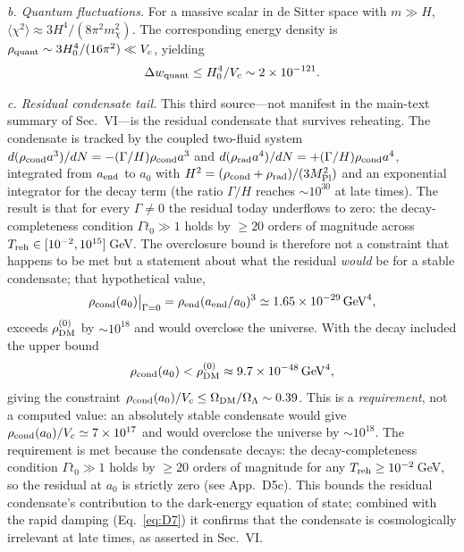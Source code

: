 \documentclass[pdflatex,sn-mathphys-num]{sn-jnl}
\providecommand{\gtrsim}{\geq}
\newcommand{\MP}{M_{\rm Pl}}
\theoremstyle{thmstyleone}
\begin{document}
\begin{appendices}
\emph{b. Quantum fluctuations.} For a massive scalar in de Sitter space with $m\gg H$, $\langle\chi^2\rangle\approx3H^4/(8\pi^2 m_\chi^2)$. The corresponding energy density is $\rho_{\rm quant}\sim3H_0^4/(16\pi^2)\ll V_c$, yielding
\begin{equation}
\Delta w_{\rm quant}\leq H_0^4/V_c\sim2\times10^{-121}.
\label{eq:D11}
\end{equation}

\emph{c. Residual condensate tail.} This third source---not manifest in the main-text summary of Sec.~VI---is the residual condensate that survives reheating. The condensate is tracked by the coupled two-fluid system $d(\rho_{\rm cond}a^3)/dN=-(\Gamma/H)\rho_{\rm cond}a^3$ and $d(\rho_{\rm rad}a^4)/dN=+(\Gamma/H)\rho_{\rm cond}a^4$, integrated from $a_{\rm end}$ to $a_0$ with $H^2=(\rho_{\rm cond}+\rho_{\rm rad})/(3\MP^2)$ and an exponential integrator for the decay term (the ratio $\Gamma/H$ reaches $\sim10^{30}$ at late times). The result is that for every $\Gamma\neq0$ the residual today underflows to zero: the decay-completeness condition $\Gamma t_0\gg1$ holds by $\geq20$ orders of magnitude across $T_{\rm reh}\in[10^{-2},10^{15}]\,$GeV. The overclosure bound is therefore not a constraint that happens to be met but a statement about what the residual \emph{would} be for a stable condensate; that hypothetical value,
\begin{equation}
\rho_{\rm cond}(a_0)\big|_{\Gamma=0}=\rho_{\rm end}(a_{\rm end}/a_0)^3\simeq1.65\times10^{-29}\,{\rm GeV}^4,
\label{eq:D12a}
\end{equation}
exceeds $\rho_{\rm DM}^{(0)}$ by $\sim10^{18}$ and would overclose the universe. With the decay included the upper bound
\begin{equation}
\rho_{\rm cond}(a_0)<\rho_{\rm DM}^{(0)}\approx9.7\times10^{-48}\,{\rm GeV}^4,
\label{eq:D12}
\end{equation}
giving the constraint $\rho_{\rm cond}(a_0)/V_c\leq\Omega_{\rm DM}/\Omega_\Lambda\sim0.39$. This is a \emph{requirement}, not a computed value: an absolutely stable condensate would give $\rho_{\rm cond}(a_0)/V_c\simeq7\times10^{17}$ and would overclose the universe by $\sim10^{18}$. The requirement is met because the condensate decays: the decay-completeness condition $\Gamma t_0\gg1$ holds by $\geq20$ orders of magnitude for any $T_{\rm reh}\gtrsim10^{-2}\,$GeV, so the residual at $a_0$ is strictly zero (see App.~D5c). This bounds the residual condensate's contribution to the dark-energy equation of state; combined with the rapid damping (Eq.~\eqref{eq:D7}) it confirms that the condensate is cosmologically irrelevant at late times, as asserted in Sec.~VI.


\end{appendices}
\end{document}
